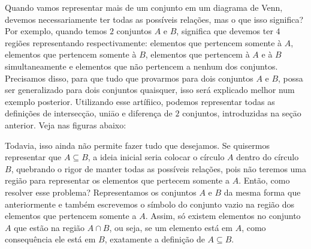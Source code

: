     Quando vamos representar mais de um conjunto em um diagrama de Venn, devemos necessariamente ter todas as possíveis relações, mas o que isso significa? Por exemplo, quando temos $2$ conjuntos $A$ e $B$, significa que devemos ter $4$ regiões representando respectivamente: elementos que pertencem somente à $A$, elementos que pertencem somente à $B$, elementos que pertencem à $A$ e à $B$ simultaneamente e elementos que não pertencem a nenhum dos conjuntos. Precisamos disso, para que tudo que provarmos para dois conjuntos $A$ e $B$, possa ser generalizado para dois conjuntos quaisquer, isso será explicado melhor num exemplo posterior.
    Utilizando esse artífiico, podemos representar todas as definições de intersecçāo, uniāo e diferença de $2$ conjuntos, introduzidas na seçāo anterior. Veja nas figuras abaixo:
    
    
    
    
    Todavia, isso ainda não permite fazer tudo que desejamos. Se quisermos representar que $A \subseteq B$, a ideia inicial seria colocar o círculo $A$ dentro do círculo $B$, quebrando o rigor de manter todas as possíveis relações, pois não teremos uma região para representar os elementos que pertecem somente a $A$. Então, como resolver esse problema? Representamos os conjuntos $A$ e $B$ da mesma forma que anteriormente e também escrevemos o símbolo do conjunto vazio na região dos elementos que pertencem somente a $A$. Assim, só existem elementos no conjunto $A$ que estão na região $A\cap B$, ou seja, se um elemento está em $A$, como consequência ele está em $B$, exatamente a definição de $A \subseteq B$.
    
    
